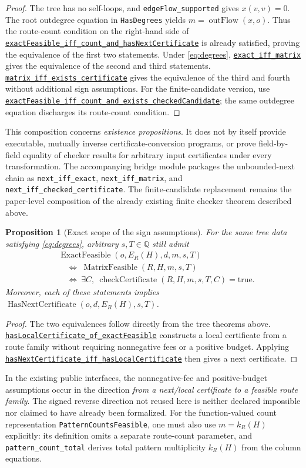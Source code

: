 \documentclass[11pt]{article}
\newtheorem{proposition}{Proposition}[section]
\theoremstyle{remark}
\newcommand{\Q}{\mathbb Q}
\newcommand{\EF}{\operatorname{ExactFeasible}}
\newcommand{\MF}{\operatorname{MatrixFeasible}}
\newcommand{\NC}{\operatorname{HasNextCertificate}}
\newcommand{\CC}{\operatorname{checkCertificate}}
\newcommand{\code}[1]{\nolinkurl{#1}}
\newcommand{\src}[2]{\href{https://github.com/huam54925-cpu/uav-routing-certification/blob/1bc992475a9bd515d77245e2bc0471e5ecab2fd5/LeanCompletion/UAV/#1.lean}{#2}}
\begin{document}
\begin{proof}
The tree has no self-loops, and \code{edgeFlow_supported} gives $x(v,v)=0$.
The root outdegree equation in \code{HasDegrees} yields
$m=\operatorname{outFlow}(x,o)$. Thus the route-count condition on the right-hand side of
\src{LocalVisitPairingNextCertificate}{
\code{exactFeasible_iff_count_and_hasNextCertificate}}
is already satisfied, proving the equivalence of the first two statements.
Under \eqref{eq:degrees},
\src{TreeBudgetMatrix}{\code{exact_iff_matrix}} gives the equivalence of the second and third statements.
\src{TreeBudgetCertificate}{\code{matrix_iff_exists_certificate}}
gives the equivalence of the third and fourth without additional sign assumptions.
For the finite-candidate version, use
\src{LocalVisitPairingFiniteChecker}{
\code{exactFeasible_iff_count_and_exists_checkedCandidate}};
the same outdegree equation discharges its route-count condition.
\end{proof}

This composition concerns \emph{existence propositions}. It does not by itself provide executable, mutually inverse certificate-conversion programs,
or prove field-by-field equality of checker results for arbitrary input certificates under every transformation.
The accompanying bridge module packages the unbounded-next chain as
\code{next_iff_exact}, \code{next_iff_matrix}, and \code{next_iff_checked_certificate}.
The finite-candidate replacement remains the paper-level composition of the already existing finite checker theorem described above.

\begin{proposition}[Exact scope of the sign assumptions]
For the same tree data satisfying \eqref{eq:degrees}, arbitrary $s,T\in\Q$ still admit
\[
 \begin{aligned}
 &\EF(o,E_R(H),d,m,s,T)\\
 &\quad\Longleftrightarrow\ \MF(R,H,m,s,T)\\
 &\quad\Longleftrightarrow\
   \exists C,\ \CC(R,H,m,s,T,C)=\mathrm{true}.
 \end{aligned}
\]
Moreover, each of these statements implies $\NC(o,d,E_R(H),s,T)$.
\end{proposition}
\begin{proof}
The two equivalences follow directly from the tree theorems above.
\src{LocalVisitPairingCompleteness}{\code{hasLocalCertificate_of_exactFeasible}}
constructs a local certificate from a route family without requiring nonnegative fees or a positive budget. Applying
\src{LocalVisitPairingNextCertificate}{\code{hasNextCertificate_iff_hasLocalCertificate}}
then gives a next certificate.
\end{proof}
In the existing public interfaces, the nonnegative-fee and positive-budget assumptions occur in the direction
\emph{from a next/local certificate to a feasible route family}.
The signed reverse direction not reused here is neither declared impossible nor claimed to have already been formalized.
For the function-valued count representation \code{PatternCountsFeasible}, one must also use
$m=k_R(H)$ explicitly: its definition omits a separate route-count parameter,
and \code{pattern_count_total} derives total pattern multiplicity $k_R(H)$ from the column equations.
\end{document}
